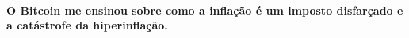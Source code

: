 \paragraph{O Bitcoin me ensinou sobre como a inflação é um imposto disfarçado e a catástrofe da hiperinflação.}

%
%
%
%
%
